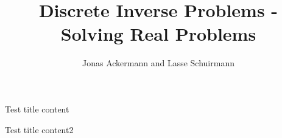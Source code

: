 \documentclass[11pt]{beamer}
\author{Jonas Ackermann and Lasse Schuirmann}
\title{Discrete Inverse Problems - Solving Real Problems}
\begin{document}
\begin{frame}
\titlepage
\end{frame}

\begin{frame}
\tableofcontents
\end{frame}

\begin{frame}{Test title}
content
\end{frame}

\begin{frame}{Test title}
content2
\end{frame}
\end{document}
